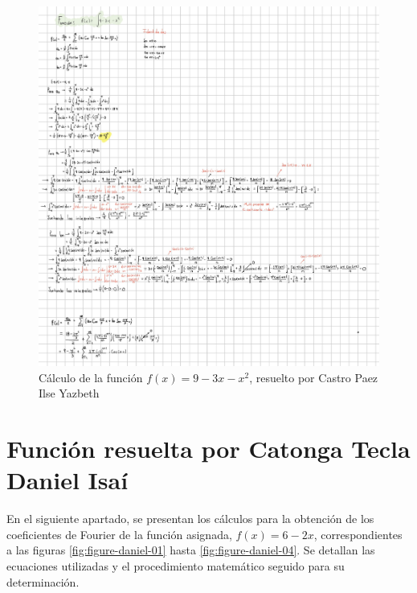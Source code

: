 {\begin{figure}[H]
    \centering
    \includegraphics[width=\linewidth]{Figures/fourierIlse/fourierIlse.jpg}
    \caption[Cálculo de la función \(f(x)=9-3x-x^2\)]{Cálculo de la función \(f(x)=9-3x-x^2\), resuelto por Castro Paez Ilse Yazbeth}
    \label{fig:figure-ilse-01}
\end{figure}



\newpage
\section{Función resuelta por Catonga Tecla Daniel Isaí}
En el siguiente apartado, se presentan los cálculos para la obtención de los coeficientes de Fourier de la función asignada, \(f(x)=6-2x\), correspondientes a las figuras \ref{fig:figure-daniel-01} hasta \ref{fig:figure-daniel-04}. Se detallan las ecuaciones utilizadas y el procedimiento matemático seguido para su determinación.

}
